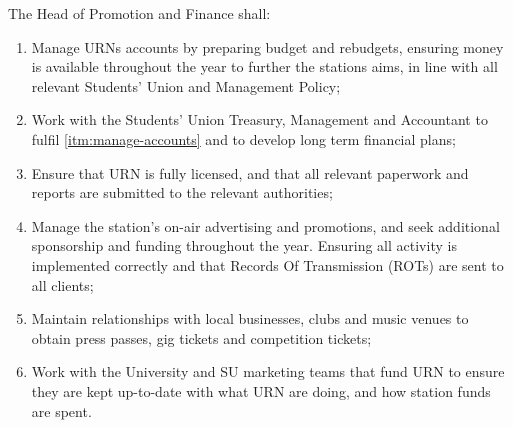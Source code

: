 \item The Head of Promotion and Finance shall:
\begin{enumerate}[label*=\arabic*.]
    \item \label{itm:manage-accounts} Manage URNs accounts by preparing budget and rebudgets, ensuring money is available throughout the year to further the stations aims, in line with all relevant Students' Union and Management Policy;
    \item Work with the Students' Union Treasury, Management and Accountant to fulfil \ref{itm:manage-accounts} and to develop long term financial plans;
    \item Ensure that URN is fully licensed, and that all relevant paperwork and reports are submitted to the relevant authorities;
    \item Manage the station's on-air advertising and promotions, and seek additional sponsorship and funding throughout the year. Ensuring all activity is implemented correctly and that Records Of Transmission (ROTs) are sent to all clients;
    \item Maintain relationships with local businesses, clubs and music venues to obtain press passes, gig tickets and competition tickets;
    \item Work with the University and SU marketing teams that fund URN to ensure they are kept up-to-date with what URN are doing, and how station funds are spent.
\end{enumerate}
